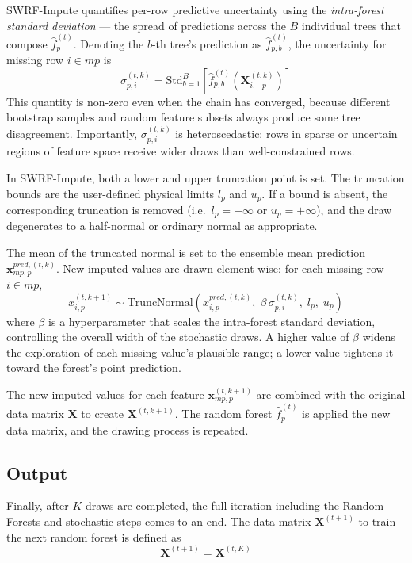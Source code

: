 \documentclass[preprint]{aastex631}
\begin{document}
SWRF-Impute quantifies per-row predictive uncertainty using the \textit{intra-forest standard deviation} --- the spread of predictions across the $B$ individual trees that compose $\hat{f}^{(t)}_p$. Denoting the $b$-th tree's prediction as $\hat{f}^{(t)}_{p,b}$, the uncertainty for missing row $i \in mp$ is
\begin{equation}
  \sigma^{(t,k)}_{p,i} = \text{Std}_{b=1}^{B}\!\left[\hat{f}^{(t)}_{p,b}\!\left(\mathbf{X}^{(t,k)}_{i,-p}\right)\right]
\end{equation}
This quantity is non-zero even when the chain has converged, because different bootstrap samples and random feature subsets always produce some tree disagreement. Importantly, $\sigma^{(t,k)}_{p,i}$ is heteroscedastic: rows in sparse or uncertain regions of feature space receive wider draws than well-constrained rows.

In SWRF-Impute, both a lower and upper truncation point is set. The truncation bounds are the user-defined physical limits $l_p$ and $u_p$. If a bound is absent, the corresponding truncation is removed (i.e.\ $l_p = -\infty$ or $u_p = +\infty$), and the draw degenerates to a half-normal or ordinary normal as appropriate.

The mean of the truncated normal is set to the ensemble mean prediction $\mathbf{x}^{pred,(t,k)}_{mp,p}$. New imputed values are drawn element-wise: for each missing row $i \in mp$,
\begin{equation}
  x^{(t,k+1)}_{i,p} \sim \text{TruncNormal}\!\left(x^{pred,(t,k)}_{i,p},\; \beta\,\sigma^{(t,k)}_{p,i},\; l_p,\; u_p\right)
\end{equation}
where $\beta$ is a hyperparameter that scales the intra-forest standard deviation, controlling the overall width of the stochastic draws. A higher value of $\beta$ widens the exploration of each missing value's plausible range; a lower value tightens it toward the forest's point prediction.

The new imputed values for each feature $\mathbf{x}^{(t,k+1)}_{mp,p}$ are combined with the original data matrix $\mathbf{X}$ to create $\mathbf{X}^{(t,k+1)}$. The random forest $\hat{f}^{(t)}_p$ is applied the new data matrix, and the drawing process is repeated.

\subsection{Output}
Finally, after $K$ draws are completed, the full iteration including the Random Forests and stochastic steps comes to an end. The data matrix $\mathbf{X}^{(t+1)}$ to train the next random forest is defined as
\begin{equation}
  \mathbf{X}^{(t+1)} = \mathbf{X}^{(t,K)}
\end{equation}
\end{document}
